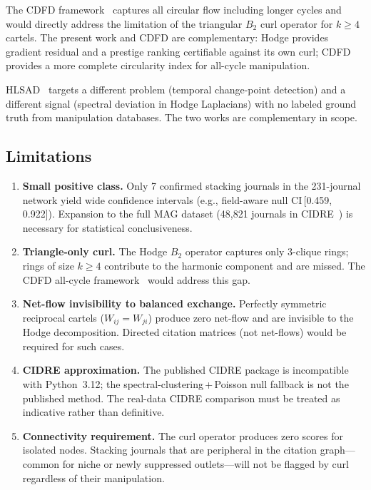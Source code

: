 \documentclass[twocolumn,11pt,letterpaper]{article}
\begin{document}
The CDFD framework~\cite{HomsDones2025} captures all circular flow including
longer cycles and would directly address the limitation of the triangular $B_2$
curl operator for $k \geq 4$ cartels. The present work and CDFD are
complementary: Hodge provides gradient residual and a prestige ranking
certifiable against its own curl; CDFD provides a more complete circularity
index for all-cycle manipulation.

HLSAD~\cite{Frantzen2025} targets a different problem (temporal change-point
detection) and a different signal (spectral deviation in Hodge Laplacians) with
no labeled ground truth from manipulation databases. The two works are
complementary in scope.

\subsection{Limitations}

\begin{enumerate}
  \item \textbf{Small positive class.} Only 7 confirmed stacking journals in
    the 231-journal network yield wide confidence intervals (e.g., field-aware
    null CI\,[0.459, 0.922]). Expansion to the full MAG dataset (48,821 journals
    in CIDRE~\cite{Kojaku2020}) is necessary for statistical conclusiveness.
  \item \textbf{Triangle-only curl.} The Hodge $B_2$ operator captures only
    3-clique rings; rings of size $k \geq 4$ contribute to the harmonic
    component and are missed. The CDFD all-cycle framework~\cite{HomsDones2025}
    would address this gap.
  \item \textbf{Net-flow invisibility to balanced exchange.} Perfectly symmetric
    reciprocal cartels ($W_{ij} = W_{ji}$) produce zero net-flow and are
    invisible to the Hodge decomposition. Directed citation matrices (not
    net-flows) would be required for such cases.
  \item \textbf{CIDRE approximation.} The published CIDRE package is
    incompatible with Python~3.12; the spectral-clustering\,+\,Poisson null
    fallback is not the published method. The real-data CIDRE comparison must
    be treated as indicative rather than definitive.
  \item \textbf{Connectivity requirement.} The curl operator produces zero
    scores for isolated nodes. Stacking journals that are peripheral in the
    citation graph---common for niche or newly suppressed outlets---will not be
    flagged by curl regardless of their manipulation.
\end{enumerate}
\end{document}
